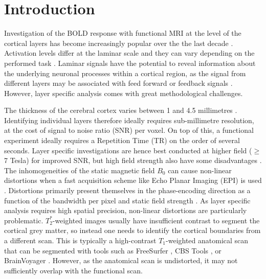 \section{Introduction}
Investigation of the BOLD response with functional MRI at the level of the cortical layers has become increasingly popular over the the last decade \cite{Dumoulin2017,Trampel2017}. Activation levels differ at the laminar scale \cite{Koopmans2011} and they can vary depending on the performed task \cite{Muckli2015,Kok2016}. Laminar signals have the potential to reveal information about the underlying neuronal processes within a cortical region, as the signal from different layers may be associated with feed forward or feedback signals \cite{Felleman1991,Self2017}. However, layer specific analysis comes with great methodological challenges.

The thickness of the cerebral cortex varies between 1 and 4.5 millimetres \cite{Zilles1990,Fischl2000}. Identifying individual layers therefore ideally requires sub-millimetre resolution, at the cost of signal to noise ratio (SNR) per voxel. On top of this, a functional experiment ideally requires a Repetition Time (TR) on the order of several seconds. Layer specific investigations are hence best conducted at higher field ($\ge$7 Tesla) for improved SNR, but high field strength also have some disadvantages \cite{Poser2017}. The inhomogeneities of the static magnetic field $B_0$ can cause non-linear distortions when a fast acquisition scheme like Echo Planar Imaging (EPI) is used \cite{Mansfield1977}. Distortions primarily present themselves in the phase-encoding direction as a function of the bandwidth per pixel and static field strength \cite{Schmitt1998}. As layer specific analysis requires high spatial precision, non-linear distortions are particularly problematic. $T_2^*$-weighted images usually have insufficient contrast to segment the cortical grey matter, so instead one needs to identify the cortical boundaries from a different scan. This is typically a high-contrast $T_1$-weighted anatomical scan that can be segmented with tools such as FreeSurfer \cite{Dale1999}, CBS Tools \cite{Bazin2014}, or BrainVoyager \cite{Goebel2012}. However, as the anatomical scan is undistorted, it may not sufficiently overlap with the functional scan. 

